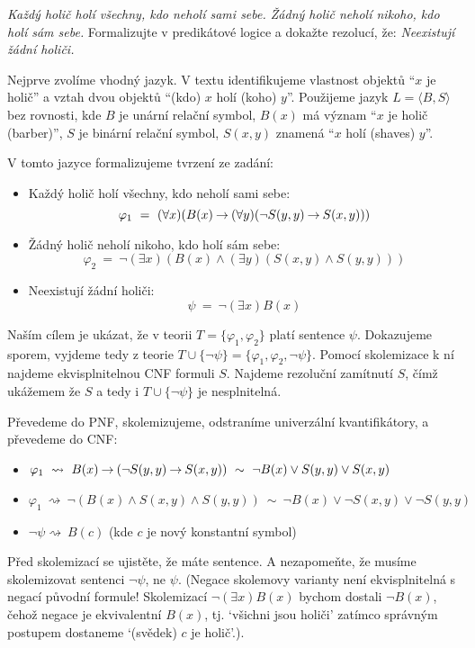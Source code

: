 \begin{problem} 
    
    \emph{Každý holič holí všechny, kdo neholí sami sebe. Žádný holič neholí nikoho, kdo holí sám sebe.} Formalizujte v predikátové logice a dokažte rezolucí, že: \emph{Neexistují žádní holiči.}

    \begin{solution}

        Nejprve zvolíme vhodný jazyk. V textu identifikujeme vlastnost objektů ``$x$ je holič'' a vztah dvou objektů ``(kdo) $x$ holí (koho) $y$''. Použijeme jazyk $L=\langle B, S\rangle$ bez rovnosti, kde $B$ je unární relační symbol, $B(x)$ má význam ``$x$ je holič (barber)'', $S$ je binární relační symbol, $S(x,y)$ znamená ``$x$ holí (shaves) $y$''. 
        
        V tomto jazyce formalizujeme tvrzení ze zadání:
        \begin{itemize}
            \item Každý holič holí všechny, kdo neholí sami sebe: 
            $$
            \varphi_1\ =\ (\forall x)(B(x)\mathbin{\rightarrow} (\forall y)(\neg S(y,y)\mathbin{\rightarrow} S(x,y)))
            $$
            \item Žádný holič neholí nikoho, kdo holí sám sebe: 
            $$
            \varphi_2\ =\ \neg (\exists x)(B(x) \land (\exists y)(S(x,y)\land S(y,y)))
            $$
            \item Neexistují žádní holiči:
            $$
            \psi\ =\ \neg (\exists x)B(x)
            $$
        \end{itemize}
        Naším cílem je ukázat, že v teorii $T=\{\varphi_1,\varphi_2\}$ platí sentence $\psi$. Dokazujeme sporem, vyjdeme tedy z teorie $T\cup\{\neg\psi\}=\{\varphi_1,\varphi_2,\neg\psi\}$. Pomocí skolemizace k ní najdeme ekvisplnitelnou CNF formuli $S$. Najdeme rezoluční zamítnutí $S$, čímž ukážemem že $S$ a tedy i $T\cup\{\neg\psi\}$ je nesplnitelná.

        Převedeme do PNF, skolemizujeme, odstraníme univerzální kvantifikátory, a převedeme do CNF:
        \begin{itemize}
            \item $\varphi_1\ \rightsquigarrow\ B(x)\limplies (\neg S(y,y)\limplies S(x,y))\ \sim \ \neg B(x)\lor S(y,y)\lor S(x,y)$
            \item $\varphi_1\ \rightsquigarrow\ \neg(B(x)\land S(x,y)\land S(y,y))\ \sim\ \neg B(x)\lor \neg S(x,y)\lor \neg S(y,y)$
            \item $\neg\psi\rightsquigarrow\ B(c)$ (kde $c$ je nový konstantní symbol)
        \end{itemize}
        Před skolemizací se ujistěte, že máte sentence. A nezapomeňte, že musíme skolemizovat sentenci $\neg\psi$, ne $\psi$. (Negace skolemovy varianty není ekvisplnitelná s negací původní formule! Skolemizací $\neg(\exists x)B(x)$ bychom dostali $\neg B(x)$, čehož negace je ekvivalentní $B(x)$, tj. `všichni jsou holiči' zatímco správným postupem dostaneme `(svědek) $c$ je holič'.). 
        

\end{solution}
\end{problem}
